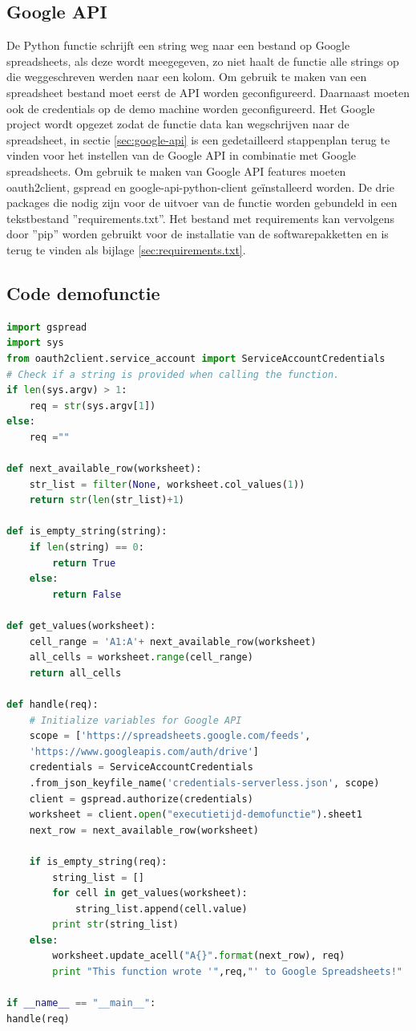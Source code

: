 \subsection{Google API}
De Python functie schrijft een string weg naar een bestand op Google spreadsheets, als deze wordt meegegeven, zo niet haalt de functie alle strings op die weggeschreven werden naar een kolom. Om gebruik te maken van een spreadsheet bestand moet eerst de API worden geconfigureerd. Daarnaast moeten ook de credentials op de demo machine worden geconfigureerd. Het Google project wordt opgezet zodat de functie data kan wegschrijven naar de spreadsheet, in sectie \ref{sec:google-api} is een gedetailleerd stappenplan terug te vinden voor het instellen van de Google API in combinatie met Google spreadsheets. Om gebruik te maken van Google API features moeten oauth2client, gspread en google-api-python-client geïnstalleerd worden. De drie packages die nodig zijn voor de uitvoer van de functie worden gebundeld in een tekstbestand ''requirements.txt''. Het bestand met requirements kan vervolgens door ''pip'' worden gebruikt voor de installatie van de softwarepakketten en is terug te vinden als bijlage \ref{sec:requirements.txt}.

\newpage
\subsection{Code demofunctie}
\label{sec:demofunctie}
\begin{lstlisting}[language=python]
import gspread
import sys
from oauth2client.service_account import ServiceAccountCredentials
# Check if a string is provided when calling the function.
if len(sys.argv) > 1:
    req = str(sys.argv[1])
else:
    req =""

def next_available_row(worksheet):
    str_list = filter(None, worksheet.col_values(1))
    return str(len(str_list)+1)

def is_empty_string(string):
    if len(string) == 0:
        return True
    else:
        return False

def get_values(worksheet):
    cell_range = 'A1:A'+ next_available_row(worksheet)
    all_cells = worksheet.range(cell_range)
    return all_cells

def handle(req):   
    # Initialize variables for Google API
    scope = ['https://spreadsheets.google.com/feeds',
    'https://www.googleapis.com/auth/drive']
    credentials = ServiceAccountCredentials
    .from_json_keyfile_name('credentials-serverless.json', scope)
    client = gspread.authorize(credentials)
    worksheet = client.open("executietijd-demofunctie").sheet1
    next_row = next_available_row(worksheet)

    if is_empty_string(req):
        string_list = []
        for cell in get_values(worksheet):
            string_list.append(cell.value)
        print str(string_list)
    else:
        worksheet.update_acell("A{}".format(next_row), req)
        print "This function wrote '",req,"' to Google Spreadsheets!"

if __name__ == "__main__":
handle(req)
\end{lstlisting}


